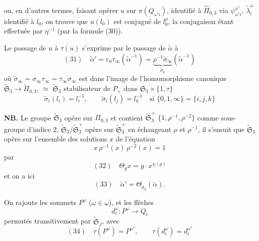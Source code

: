 \documentclass[11pt,a4paper]{article}
\begin{document}
ou, en d'autres termes, faisant opérer $u$ sur $\pi(Q_{\omega' i})$, identifié à $\widehat{\Pi}_{0,3}$ via $\psi^{\omega'}_{\omega' i}$, $\tilde\lambda_i^{\omega}$ identifié à $l_0$, on trouve que $u(l_0)$ est conjugué de $l_0^{p}$, \struck{\ill{}} la conjugaison étant effectuée par $\eta^{-1}$ (par la formule (30)).

Le passage de $u$ à $\tau(u)$ s'exprime par  le passage de $\tilde\alpha$ à
\[
(31)\quad \tilde\alpha' = \varepsilon_0 \tau_\infty(\tilde\alpha^{-1}) = \underbrace{\rho^{-1} \tilde\sigma_\infty}_{\tilde\sigma_0}(\tilde\alpha^{-1})
\]
où $\tilde\sigma_\infty = \sigma_\infty \tau_\infty = \tau_\infty \sigma_\infty$ est dans l'image de l'homomorphisme canonique $\widetilde{\mathfrak{S}}_3 \to \widetilde{\Pi}_{0,3}$, \struck{\ill{}} $\simeq$ $\widetilde{\mathfrak{S}}_3$ stabilisateur de $P_{+}$ dans $\mathfrak{S}_3 \times \{1, \tau\}$
\[
\tilde\sigma_i(l_i) = l_i^{-1}, \qquad
\tilde\sigma_i(l_j) = l_k^{-1} \quad \text{si } \{0, 1, \infty\} = \{i, j, k\}
\]

\textbf{NB.} Le groupe $\widetilde{\mathfrak{S}}_3$ opère sur $\Pi_{0,3}$ et contient $\widetilde{\mathfrak{S}}_3^{+}$ \struck{\ill{}} $\{1, \rho^{-1}, \rho^{-2}\}$ comme sous-groupe d'indice 2,  $\widetilde{\mathfrak{S}}_3 / \widetilde{\mathfrak{S}}_3^{+}$ opère sur $\widetilde{\mathfrak{S}}_3^{+}$ en échangeant $\rho$ et $\rho^{-1}$, il s'ensuit que $\widetilde{\mathfrak{S}}_3$ opère sur l'ensemble des solutions $x$ de l'équation
\[
x\, \rho^{-1}(x)\, \rho^{-2}(x) = 1
\]
par
\[
(32)\quad \Theta_g x = g \cdot x^{\chi(g)}
\]
et on a ici
\[
(33)\quad \tilde\alpha' = \Theta_{\tilde\sigma_0}(\tilde\alpha).
\]

On rajoute les  sommets $P^{\omega}$ ($\omega \in \underline{\omega}$), et les flèches
\[
d_i^{\omega} : P^{\omega} \to Q_i
\]
permutés transitivement par $\widetilde{\mathfrak{S}}_J$, avec
\[
(34)\quad \tau(P^{\omega}) = P^{\omega'}, \qquad \tau(d_i^{\omega}) = d_i^{\omega'}
\]
\end{document}
